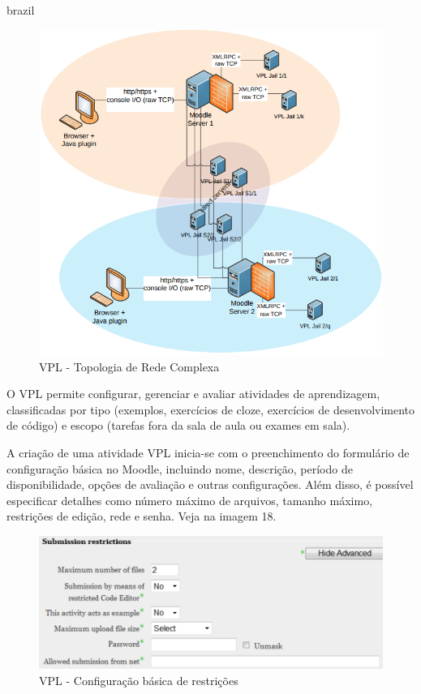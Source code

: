 \begin{otherlanguage*}{brazil}
\begin{figure}[h!]
	   \centering
            \caption{VPL - Topologia de Rede Complexa}
            \label{fig:ModeloConceitual}
	   	\includegraphics[scale=0.3]{pictures/VPL_topologia.png}
\end{figure}

O VPL permite configurar, gerenciar e avaliar atividades de aprendizagem, classificadas por tipo (exemplos, exercícios de cloze, exercícios de desenvolvimento de código) e escopo (tarefas fora da sala de aula ou exames em sala).

A criação de uma atividade VPL inicia-se com o preenchimento do formulário de configuração básica no Moodle, incluindo nome, descrição, período de disponibilidade, opções de avaliação e outras configurações. Além disso, é possível especificar detalhes como número máximo de arquivos, tamanho máximo, restrições de edição, rede e senha. Veja na imagem 18.

\begin{figure}[h!]
	   \centering
            \caption{VPL - Configuração básica de restrições}
            \label{fig:ModeloConceitual}
	   	\includegraphics[scale=0.3]{pictures/VPL_config_basica.png}
\end{figure}


\end{otherlanguage*}
